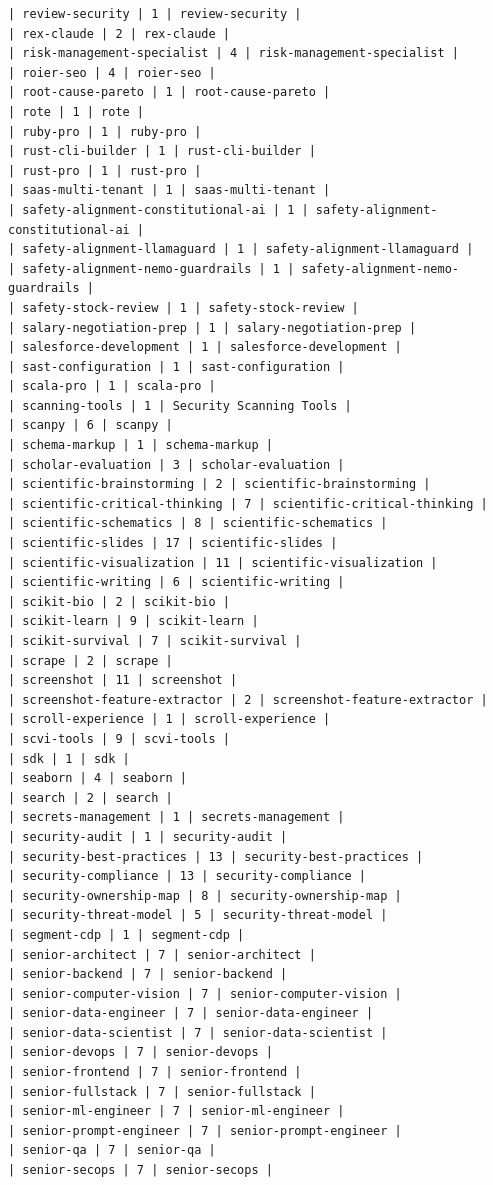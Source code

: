 \begin{Verbatim}[breaklines,breakanywhere,fontsize=\footnotesize]
| review-security | 1 | review-security |
| rex-claude | 2 | rex-claude |
| risk-management-specialist | 4 | risk-management-specialist |
| roier-seo | 4 | roier-seo |
| root-cause-pareto | 1 | root-cause-pareto |
| rote | 1 | rote |
| ruby-pro | 1 | ruby-pro |
| rust-cli-builder | 1 | rust-cli-builder |
| rust-pro | 1 | rust-pro |
| saas-multi-tenant | 1 | saas-multi-tenant |
| safety-alignment-constitutional-ai | 1 | safety-alignment-constitutional-ai |
| safety-alignment-llamaguard | 1 | safety-alignment-llamaguard |
| safety-alignment-nemo-guardrails | 1 | safety-alignment-nemo-guardrails |
| safety-stock-review | 1 | safety-stock-review |
| salary-negotiation-prep | 1 | salary-negotiation-prep |
| salesforce-development | 1 | salesforce-development |
| sast-configuration | 1 | sast-configuration |
| scala-pro | 1 | scala-pro |
| scanning-tools | 1 | Security Scanning Tools |
| scanpy | 6 | scanpy |
| schema-markup | 1 | schema-markup |
| scholar-evaluation | 3 | scholar-evaluation |
| scientific-brainstorming | 2 | scientific-brainstorming |
| scientific-critical-thinking | 7 | scientific-critical-thinking |
| scientific-schematics | 8 | scientific-schematics |
| scientific-slides | 17 | scientific-slides |
| scientific-visualization | 11 | scientific-visualization |
| scientific-writing | 6 | scientific-writing |
| scikit-bio | 2 | scikit-bio |
| scikit-learn | 9 | scikit-learn |
| scikit-survival | 7 | scikit-survival |
| scrape | 2 | scrape |
| screenshot | 11 | screenshot |
| screenshot-feature-extractor | 2 | screenshot-feature-extractor |
| scroll-experience | 1 | scroll-experience |
| scvi-tools | 9 | scvi-tools |
| sdk | 1 | sdk |
| seaborn | 4 | seaborn |
| search | 2 | search |
| secrets-management | 1 | secrets-management |
| security-audit | 1 | security-audit |
| security-best-practices | 13 | security-best-practices |
| security-compliance | 13 | security-compliance |
| security-ownership-map | 8 | security-ownership-map |
| security-threat-model | 5 | security-threat-model |
| segment-cdp | 1 | segment-cdp |
| senior-architect | 7 | senior-architect |
| senior-backend | 7 | senior-backend |
| senior-computer-vision | 7 | senior-computer-vision |
| senior-data-engineer | 7 | senior-data-engineer |
| senior-data-scientist | 7 | senior-data-scientist |
| senior-devops | 7 | senior-devops |
| senior-frontend | 7 | senior-frontend |
| senior-fullstack | 7 | senior-fullstack |
| senior-ml-engineer | 7 | senior-ml-engineer |
| senior-prompt-engineer | 7 | senior-prompt-engineer |
| senior-qa | 7 | senior-qa |
| senior-secops | 7 | senior-secops |

\end{Verbatim}
